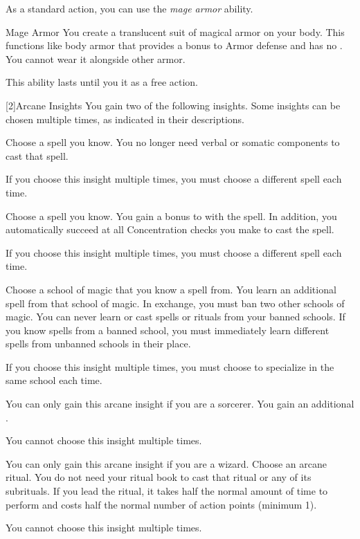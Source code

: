          As a standard action, you can use the \textit{mage armor} ability.
        \begin{ability}{Mage Armor}
            You create a translucent suit of magical armor on your body.
            This functions like body armor that provides a  bonus to Armor defense and has no .
            You cannot wear it alongside other armor.

            This ability lasts until you  it as a free action.
        \end{ability}

        [2]{Arcane Insights} 
        You gain two of the following insights.
        Some insights can be chosen multiple times, as indicated in their descriptions.

        {
             Choose a spell you know.
            You no longer need verbal or somatic components to cast that spell.
            \par If you choose this insight multiple times, you must choose a different spell each time.

             Choose a spell you know.
            You gain a  bonus to  with the spell.
            In addition, you automatically succeed at all Concentration checks you make to cast the spell.
            \par If you choose this insight multiple times, you must choose a different spell each time.

             Choose a school of magic that you know a spell from.
            You learn an additional spell from that school of magic.
            In exchange, you must ban two other schools of magic.
            You can never learn or cast spells or rituals from your banned schools.
            If you know spells from a banned school, you must immediately learn different spells from unbanned schools in their place.
            \par If you choose this insight multiple times, you must choose to specialize in the same school each time.

             You can only gain this arcane insight if you are a sorcerer.
            You gain an additional .
            \par You cannot choose this insight multiple times.

             You can only gain this arcane insight if you are a wizard.
            Choose an arcane ritual.
            You do not need your ritual book to cast that ritual or any of its subrituals.
            If you lead the ritual, it takes half the normal amount of time to perform and costs half the normal number of action points (minimum 1).
            \par You cannot choose this insight multiple times.
        }

